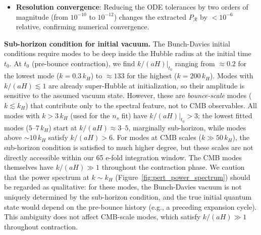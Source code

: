 \documentclass[11pt,a4paper]{article}
\begin{document}
\begin{itemize}
\begin{equation}
\end{equation}
confirming super-Hubble conservation at the sub-percent level (genuine time-drift of $|\mathcal{R}|^2$ between two specific e-fold markers, not the fractional spread around a window mean, which would instead measure integrator oscillation noise). For modes near $k \sim k_H$, freezeout is incomplete within the 3 e-fold extraction window, making $P_\mathcal{R}$ at those wavenumbers less reliable; these modes are excluded from the $n_s$ fit (which uses only $k > 3\,k_H$).
\item \textbf{Resolution convergence}: Reducing the ODE tolerances by two orders of magnitude (from $10^{-10}$ to $10^{-12}$) changes the extracted $P_\mathcal{R}$ by $< 10^{-6}$ relative, confirming numerical convergence.
\end{itemize}

\textbf{Sub-horizon condition for initial vacuum.} The Bunch-Davies initial conditions require modes to be deep inside the Hubble radius at the initial time $t_0$. At $t_0$ (pre-bounce contraction), we find $k/(aH)|_{t_0}$ ranging from $\approx 0.2$ for the lowest mode ($k = 0.3\,k_H$) to $\approx 133$ for the highest ($k = 200\,k_H$). Modes with $k/(aH) \lesssim 1$ are already super-Hubble at initialization, so their amplitude is sensitive to the assumed vacuum state. However, these are \emph{bounce-scale} modes ($k \lesssim k_H$) that contribute only to the spectral feature, not to CMB observables. All modes with $k > 3\,k_H$ (used for the $n_s$ fit) have $k/(aH)|_{t_0} > 3$; the lowest fitted modes ($5$--$7\,k_H$) start at $k/(aH) \approx 3$--$5$, marginally sub-horizon, while modes above $\sim 10\,k_H$ satisfy $k/(aH) > 6$. For modes at CMB scales ($k \gg 50\,k_H$), the sub-horizon condition is satisfied to much higher degree, but these scales are not directly accessible within our 65 e-fold integration window. The CMB modes themselves have $k/(aH) \gg 1$ throughout the contraction phase. We caution that the power spectrum at $k \sim k_H$ (Figure~\ref{fig:pert_power_spectrum}) should be regarded as qualitative: for these modes, the Bunch-Davies vacuum is not uniquely determined by the sub-horizon condition, and the true initial quantum state would depend on the pre-bounce history (e.g., a preceding expansion cycle). This ambiguity does not affect CMB-scale modes, which satisfy $k/(aH) \gg 1$ throughout contraction.
\end{document}
